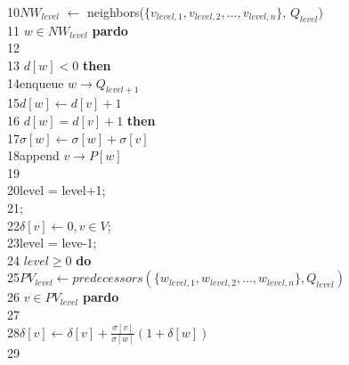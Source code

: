 \begin{flushleft}
\begin{algorithm}
	10\hspace*{2pc}$NW_{level}$ $\leftarrow$ neighbors($\{v_{level,1},v_{level,2},...,v_{level,n}\}$, $Q_{level}$)\\
	11\hspace*{2pc}{\bf for} $w \in NW_{level}$ {\bf pardo}\\
	12\hspace*{3pc}{\it lock;}\\
	13\hspace*{3pc}{\bf if} $d[w]<0$ {\bf then}\\
	14\hspace*{4pc}enqueue $w\rightarrow Q_{level+1}$\\
	15\hspace*{4pc}$d[w]\leftarrow d[v]+1$\\
	16\hspace*{3pc}{\bf if} $d[w]=d[v]+1$ {\bf then}\\
	17\hspace*{4pc}$\sigma[w]\leftarrow \sigma[w]+\sigma[v]$\\
	18\hspace*{4pc}append $v\rightarrow P[w]$\\
	19\hspace*{3pc}{\it unlock;}\\
	20\hspace*{2pc}level = level+1;\\
	21\hspace*{2pc}{\bf sync};\\
	22\hspace*{1pc}$\delta[v]\leftarrow 0, v\in V$;\\
	23\hspace*{1pc}level = leve-1;\\
	24\hspace*{1pc}{\bf while} $level \ge 0$ {\bf do} \\
	25\hspace*{2pc}$PV_{level}\leftarrow predecessors(\{w_{level,1},w_{level,2},...,w_{level,n}\}, Q_{level})$\\
	26\hspace*{2pc}{\bf for} $v\in PV_{level}$ {\bf pardo}\\
	27\hspace*{3pc}{\it lock;}\\
	28\hspace*{3pc}$\delta[v]\leftarrow\delta[v]+\frac{\sigma[v]}{\sigma[w]}(1+\delta[w])$\\
	29\hspace*{3pc}{\it unlock;}\\

\end{algorithm}
\end{flushleft}
